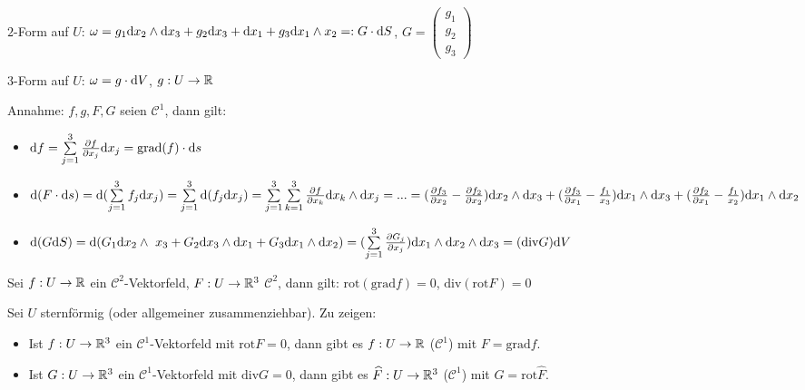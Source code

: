 \documentclass{cheat-sheet}
\begin{document}
$2$-Form auf $U$: $\omega = g_1 \mathrm{d} x_2 \wedge \mathrm{d} x_3 + g_2 \mathrm{d} x_3 + \mathrm{d} x_1 + g_3 \mathrm{d} x_1 \wedge x_2 =: G \cdot \mathrm{d} S$, $G = \begin{pmatrix} g_1 \\ g_2 \\ g_3 \end{pmatrix}$

$3$-Form auf $U$: $\omega = g \cdot \mathrm{d} V$, $g : U \to \mathbb{R}$

Annahme: $f, g, F, G$ seien $\mathcal{C}^1$, dann gilt:

\begin{itemize}
  \item $\d f = \sum_{j=1}^3 \frac{\partial f}{\partial x_j} \d x_j = \mathrm{grad}(f) \cdot \d s$
  \item $\d (F \cdot \d s) = \d (\sum_{j=1}^3 f_j \d x_j) = \sum_{j=1}^3 \d (f_j \d x_j) = \sum_{j=1}^3 \sum_{k=1}^3 \frac{\partial f}{\partial x_k} \d x_k \wedge \d x_j = ... = (\frac{\partial f_3}{\partial x_2} - \frac{\partial f_2}{\partial x_2}) \d x_2 \wedge \d x_3 + (\frac{\partial f_3}{\partial x_1} - \frac{f_1}{x_3}) \d x_1 \wedge \d x_3 + (\frac{\partial f_2}{\partial x_1} - \frac{f_1}{x_2}) \d x_1 \wedge \d x_2$
  \item $\d (G \d S) = \d (G_1 \d x_2 \wedge \ x_3 + G_2 \d x_3 \wedge \d x_1 + G_3 \d x_1 \wedge \d x_2) = (\sum_{j=1}^3 \frac{\partial G_j}{\partial x_j}) \d x_1 \wedge \d x_2 \wedge \d x_3 = (\mathrm{div} G) \d V$
\end{itemize}


Sei $f : U \to \mathbb{R}$ ein $\mathcal{C}^2$-Vektorfeld, $F : U \to \mathbb{R}^3$ $\mathcal{C}^2$, dann gilt:
$\mathrm{rot} (\mathrm{grad} f) = 0$, $\mathrm{div}(\mathrm{rot} F) = 0$


Sei $U$ sternförmig (oder allgemeiner zusammenziehbar). Zu zeigen:

\begin{itemize}
  \item Ist $f : U \to \mathbb{R}^3$ ein $\mathcal{C}^1$-Vektorfeld mit $\mathrm{rot} F = 0$, dann gibt es $f : U \to \mathbb{R}$ ($\mathcal{C}^1$) mit $F = \mathrm{grad} f$.
  \item Ist $G : U \to \mathbb{R}^3$ ein $\mathcal{C}^1$-Vektorfeld mit $\mathrm{div} G = 0$, dann gibt es $\widehat{F} : U \to \mathbb{R}^3$ ($\mathcal{C}^1$) mit $G = \mathrm{rot} \widehat{F}$.
\end{itemize}


\end{document}
